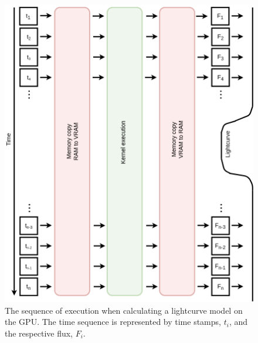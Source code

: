 \begin{figure}
    \centering
    \includegraphics[width = \textwidth]{9-Discussion/images/GPU_execution_1.png}
    \caption{The sequence of execution when calculating a lightcurve model on the GPU. The time sequence is represented by time stamps, $t_i$, and the respective flux, $F_i$.  }
    \label{discussion:fig:GPU_execution_1}
\end{figure}


